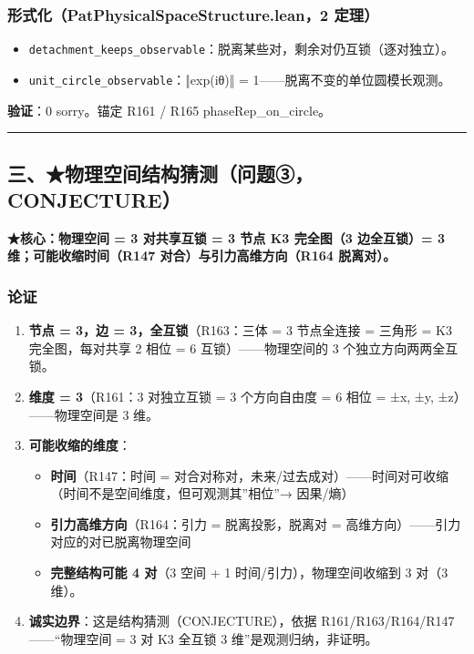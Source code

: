 \documentclass[
]{article}
\providecommand{\tightlist}{%
  \setlength{\itemsep}{0pt}\setlength{\parskip}{0pt}}
\begin{document}
\subsubsection{形式化（PatPhysicalSpaceStructure.lean，2
定理）}\label{ux5f62ux5f0fux5316patphysicalspacestructure.lean2-ux5b9aux7406}

\begin{itemize}
\tightlist
\item
  \texttt{detachment\_keeps\_observable}：脱离某些对，剩余对仍互锁（逐对独立）。
\item
  \texttt{unit\_circle\_observable}：‖exp(iθ)‖ =
  1------脱离不变的单位圆模长观测。
\end{itemize}

\textbf{验证}：0 sorry。锚定 R161 / R165 phaseRep\_on\_circle。

\begin{center}\rule{0.5\linewidth}{0.5pt}\end{center}

\subsection{三、★物理空间结构猜测（问题③，CONJECTURE）}\label{ux4e09ux7269ux7406ux7a7aux95f4ux7ed3ux6784ux731cux6d4bux95eeux9898ux2462conjecture}

\textbf{★核心：物理空间 = 3 对共享互锁 = 3 节点 K3 完全图（3 边全互锁）=
3 维；可能收缩时间（R147 对合）与引力高维方向（R164 脱离对）。}

\subsubsection{论证}\label{ux8bbaux8bc1-2}

\begin{enumerate}
\def\labelenumi{\arabic{enumi}.}
\tightlist
\item
  \textbf{节点 = 3，边 = 3，全互锁}（R163：三体 = 3 节点全连接 = 三角形
  = K3 完全图，每对共享 2 相位 = 6 互锁）------物理空间的 3
  个独立方向两两全互锁。
\item
  \textbf{维度 = 3}（R161：3 对独立互锁 = 3 个方向自由度 = 6 相位 = ±x,
  ±y, ±z）------物理空间是 3 维。
\item
  \textbf{可能收缩的维度}：

  \begin{itemize}
  \tightlist
  \item
    \textbf{时间}（R147：时间 =
    对合对称对，未来/过去成对）------时间对可收缩（时间不是空间维度，但可观测其''相位''→
    因果/熵）
  \item
    \textbf{引力高维方向}（R164：引力 = 脱离投影，脱离对 =
    高维方向）------引力对应的对已脱离物理空间
  \item
    \textbf{完整结构可能 4 对}（3 空间 + 1 时间/引力），物理空间收缩到 3
    对（3 维）。
  \end{itemize}
\item
  \textbf{诚实边界}：这是结构猜测（CONJECTURE），依据
  R161/R163/R164/R147------``物理空间 = 3 对 K3 全互锁 3
  维''是观测归纳，非证明。
\end{enumerate}
\end{document}
